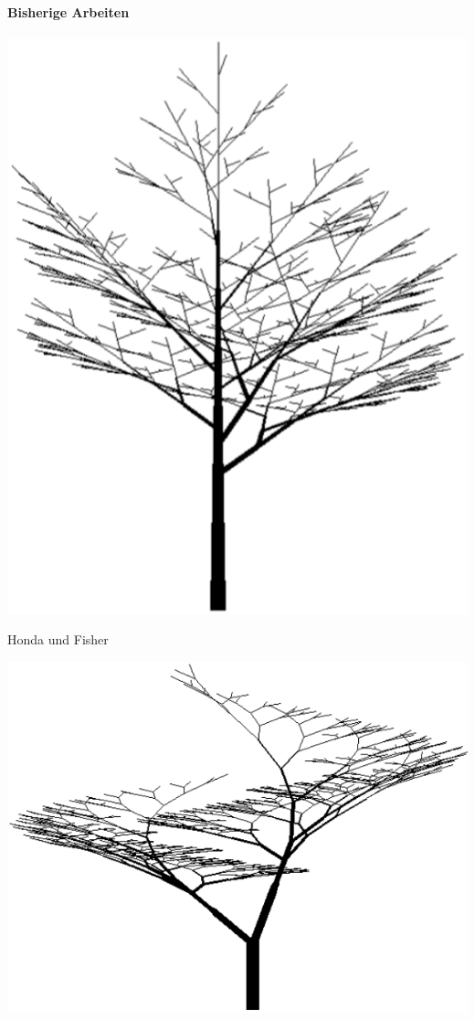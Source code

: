 \paragraph{Bisherige Arbeiten}
\begin{center}
	\begin{minipage}[c]{0.45\textwidth}
		\centering
		\includegraphics[height=0.6\textheight]{images/CH1_Honda1.png}
		
		Honda und Fisher \cite{ABOP:04}
	\end{minipage}
	\hspace{.05\textwidth}	
	\begin{minipage}[c]{0.45\textwidth}
		\centering
		\includegraphics[height=0.6\textheight]{images/CH1_AonoKunii1.png}
		

\end{minipage}
\end{center}

